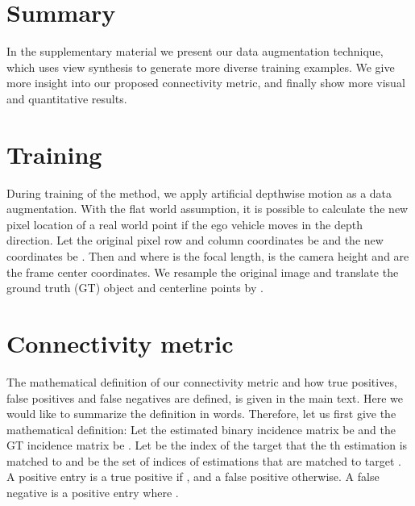 \documentclass[10pt,twocolumn,letterpaper]{article}
\begin{document}
{\small


}

\newpage
{}

\section{Summary}

In the supplementary material we present our data augmentation technique, which uses view synthesis to generate more diverse training examples. We give more insight into our proposed connectivity metric, and finally show more visual and quantitative results.

\section{Training}

During training of the method, we apply artificial depthwise motion as a data augmentation. With the flat world assumption, it is possible to calculate the new pixel location of a real world point if the ego vehicle moves  in the depth direction. Let the original pixel row and column coordinates be  and the new coordinates be . Then  and  where  is the focal length,  is the camera height and  are the frame center coordinates. We resample the original image and translate the ground truth (GT) object and centerline points by . 


\section{Connectivity metric}

The mathematical definition of our connectivity metric and how true positives, false positives and false negatives are defined, is given in the main text. Here we would like to summarize the definition in words. Therefore, let us first give the mathematical definition:
Let the estimated binary incidence matrix be  and the GT incidence matrix be . Let  be the index of the target that the th estimation is matched to and  be the set of indices of estimations that are matched to target . A positive entry  is a true positive if , and a false positive otherwise. A false negative is a positive entry  where . 
\end{document}
